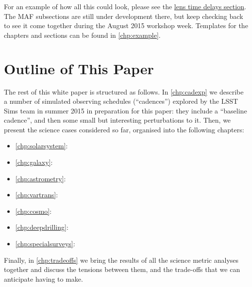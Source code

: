 For an example of how all this could look, please see the
\hyperref[sec:lenstimedelays]{lens
time delays section}. The MAF subsections are still under development
there, but keep checking back to see it come together during the
August 2015 workshop week. Templates for the chapters and sections can
be found in \autoref{chp:example}.



\section{Outline of This Paper}
\def\secname{intro:outline}\label{sec:\secname}

The rest of this white paper is structured as follows. In
\autoref{chp:cadexp} we describe a number of \OpSim simulated observing
schedules (``cadences'') explored by the LSST Sims team in summer 2015
in preparation for this paper: they include a ``baseline cadence'', and
then some small but interesting perturbations to it. Then, we present
the science cases considered so far, organised into the following
chapters:

\begin{itemize}
    \item \autoref{chp:solarsystem}: 
    \item \autoref{chp:galaxy}: 
    \item \autoref{chp:astrometry}: 
    \item \autoref{chp:vartrans}: 
    \item \autoref{chp:cosmo}: 
    \item \autoref{chp:deepdrilling}: 
    \item \autoref{chp:specialsurveys}: 
\end{itemize}

Finally, in \autoref{chp:tradeoffs} we bring the results of all the
science metric analyses  together and discuss the tensions between
them, and the trade-offs that we can anticipate having to make.

\navigationbar

